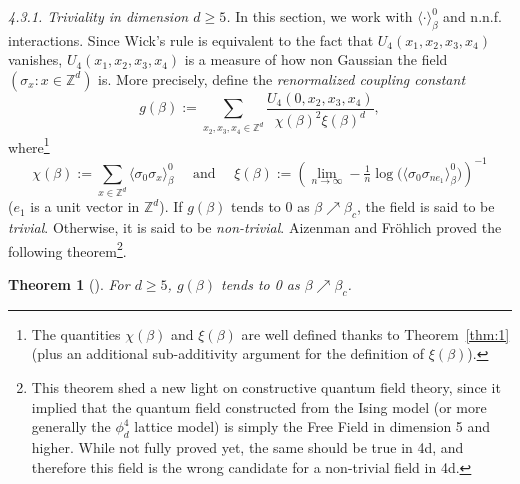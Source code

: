 \documentclass[a4paper,oneside,11pt]{article}
\newtheorem{theorem}{Theorem}[section]
\newcommand{\ee}{\end{equation}}
\newcommand{\be}{\begin{equation}}
\begin{document}
\medbreak\noindent
{\em 4.3.1. Triviality in dimension $d\ge5$.} 
In this section, we work with $\langle \cdot\rangle_{\beta}^0$ and n.n.f. interactions.  Since Wick's rule is equivalent to the fact that $U_4(x_1,x_2,x_3,x_4)$ vanishes, $U_4(x_1,x_2,x_3,x_4)$ is a measure of how non Gaussian the field $(\sigma_x:x\in\mathbb Z^d)$ is. More precisely, define the {\em renormalized coupling constant} 
\be
g(\beta):=\sum_{x_2,x_3,x_4\in\mathbb Z^d}\frac{U_4(0,x_2,x_3,x_4)}{\chi(\beta)^2\xi(\beta)^d},
\ee
where\footnote{The quantities $\chi(\beta)$ and $\xi(\beta)$ are well defined thanks to Theorem~\ref{thm:1} (plus an additional sub-additivity argument for the definition of $\xi(\beta)$). }
\be
\chi(\beta):=\sum_{x\in\mathbb Z^d}\langle\sigma_0\sigma_x\rangle_{\beta}^0\quad\text{ and }\quad\xi(\beta):=\left(\lim_{n\rightarrow\infty}-\tfrac1n\log\big(\langle\sigma_0\sigma_{ne_1}\rangle_\beta^0\big)\right)^{-1}
\ee
($e_1$ is a unit vector in $\mathbb Z^d$). If $g(\beta)$ tends to 0 as $\beta\nearrow\beta_c$, the field is said to be {\em trivial}. Otherwise, it is said to be {\em non-trivial}. 
Aizenman and Fr\"ohlich proved the following theorem\footnote{This theorem shed a new light on constructive quantum field theory, since it implied that the quantum field constructed from the Ising model (or more generally the $\phi^4_d$ lattice model) is simply the Free Field in dimension 5 and higher. While not fully proved yet, the same should be true in 4d, and therefore this field is the wrong candidate for a non-trivial field in 4d.}. 

\begin{theorem}[\cite{Aiz82,Fro82}]\label{thm:triviality}
For $d\ge5$, $g(\beta)$ tends to 0 as $\beta\nearrow\beta_c$.
\end{theorem}
\end{document}
